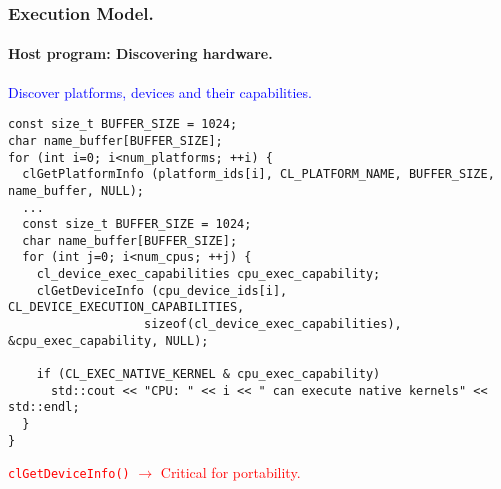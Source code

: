 \documentclass{beamer}
\newcommand{\func}[1]{\lstinline[basicstyle=\sffamily]{#1()}}
\begin{document}
\begin{frame}[fragile]
\frametitle{Execution Model.}
\framesubtitle{Host program: Discovering hardware.}
  \begin{center}
  \textcolor{blue}{Discover platforms, devices and their capabilities.}
  \end{center}
\begin{center}
\begin{minipage}{0.8\textwidth}
  \begin{lstlisting}
const size_t BUFFER_SIZE = 1024;
char name_buffer[BUFFER_SIZE];
for (int i=0; i<num_platforms; ++i) {
  clGetPlatformInfo (platform_ids[i], CL_PLATFORM_NAME, BUFFER_SIZE, name_buffer, NULL);
  ...
  const size_t BUFFER_SIZE = 1024;
  char name_buffer[BUFFER_SIZE];
  for (int j=0; i<num_cpus; ++j) {
    cl_device_exec_capabilities cpu_exec_capability;
    clGetDeviceInfo (cpu_device_ids[i], CL_DEVICE_EXECUTION_CAPABILITIES, 
                   sizeof(cl_device_exec_capabilities), &cpu_exec_capability, NULL);
  
    if (CL_EXEC_NATIVE_KERNEL & cpu_exec_capability)
      std::cout << "CPU: " << i << " can execute native kernels" << std::endl;
  }
}
  \end{lstlisting}
\end{minipage}
\end{center}
\begin{center}
\textcolor{red}{\func{clGetDeviceInfo} $\rightarrow{}$ Critical for portability.}
\end{center}
\end{frame}
\end{document}
